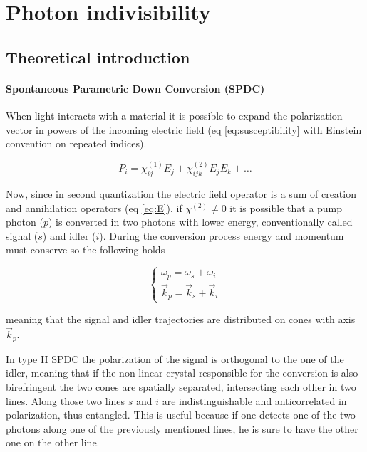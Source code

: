 \documentclass[a4paper, 11pt]{article}
\begin{document}
\section{Photon indivisibility}
  \subsection{Theoretical introduction}
    \paragraph{Spontaneous Parametric Down Conversion (SPDC)}
      When light interacts with a material it is possible to expand the polarization vector in powers of the incoming electric field (eq \ref{eq:susceptibility} with Einstein convention on repeated indices).

      \begin{equation} \label{eq:susceptibility}
        P_i = \chi_{ij}^{(1)} E_j + \chi_{ijk}^{(2)} E_j E_k + \dots
      \end{equation}

      Now, since in second quantization the electric field operator is a sum of creation and annihilation operators (eq \ref{eq:E}), if $\chi^{(2)} \neq 0$ it is possible that a pump photon ($p$) is converted in two photons with lower energy, conventionally called signal ($s$) and idler ($i$). During the conversion process energy and momentum must conserve so the following holds

      \begin{equation*}
        \begin{cases}
          \omega_p = \omega_s + \omega_i \\
          \vec{k}_p = \vec{k}_s + \vec{k}_i
        \end{cases}
      \end{equation*}

      meaning that the signal and idler trajectories are distributed on cones with axis $\vec{k}_p$.

      In type II SPDC the polarization of the signal is orthogonal to the one of the idler, meaning that if the non-linear crystal responsible for the conversion is also birefringent the two cones are spatially separated, intersecting each other in two lines. Along those two lines $s$ and $i$ are indistinguishable and anticorrelated in polarization, thus entangled.
      This is useful because if one detects one of the two photons along one of the previously mentioned lines, he is sure to have the other one on the other line.
\end{document}
